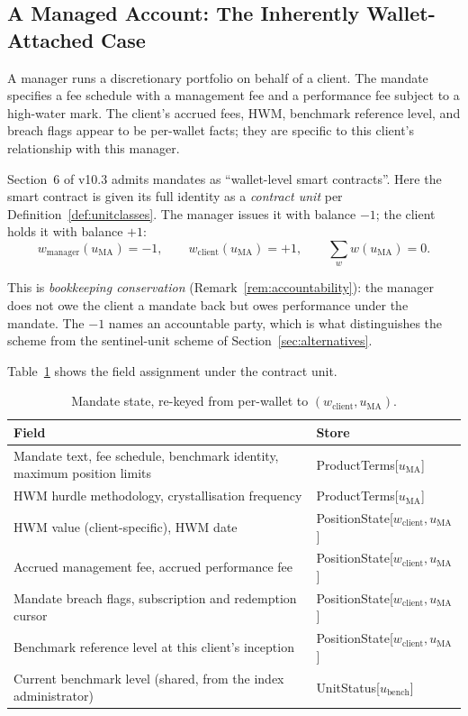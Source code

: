 \documentclass[11pt,a4paper]{article}
\begin{document}
\subsection{A Managed Account: The Inherently Wallet-Attached Case}
\label{sec:managed}

A manager runs a discretionary portfolio on behalf of a client. The mandate specifies a fee schedule with a management fee and a performance fee subject to a high-water mark. The client's accrued fees, HWM, benchmark reference level, and breach flags appear to be per-wallet facts; they are specific to this client's relationship with this manager.

Section~6 of v10.3 admits mandates as ``wallet-level smart contracts''. Here the smart contract is given its full identity as a \emph{contract unit} per Definition~\ref{def:unitclasses}. The manager issues it with balance $-1$; the client holds it with balance $+1$:
\[
w_{\mathrm{manager}}(u_{\mathrm{MA}}) = -1, \qquad w_{\mathrm{client}}(u_{\mathrm{MA}}) = +1, \qquad \sum_w w(u_{\mathrm{MA}}) = 0.
\]

\noindent This is \emph{bookkeeping conservation} (Remark~\ref{rem:accountability}): the manager does not owe the client a mandate back but owes performance under the mandate. The $-1$ names an accountable party, which is what distinguishes the scheme from the sentinel-unit scheme of Section~\ref{sec:alternatives}.

Table~\ref{tab:mandate} shows the field assignment under the contract unit.

\begin{longtable}{p{8.5cm}p{5.5cm}}
\caption{Mandate state, re-keyed from per-wallet to $(w_{\mathrm{client}}, u_{\mathrm{MA}})$.}\label{tab:mandate}\\
\toprule
\textbf{Field} & \textbf{Store} \\
\midrule
Mandate text, fee schedule, benchmark identity, maximum position limits & ProductTerms[$u_{\mathrm{MA}}$] \\
HWM hurdle methodology, crystallisation frequency & ProductTerms[$u_{\mathrm{MA}}$] \\
HWM value (client-specific), HWM date & PositionState[$w_{\mathrm{client}}, u_{\mathrm{MA}}$] \\
Accrued management fee, accrued performance fee & PositionState[$w_{\mathrm{client}}, u_{\mathrm{MA}}$] \\
Mandate breach flags, subscription and redemption cursor & PositionState[$w_{\mathrm{client}}, u_{\mathrm{MA}}$] \\
Benchmark reference level at this client's inception & PositionState[$w_{\mathrm{client}}, u_{\mathrm{MA}}$] \\
Current benchmark level (shared, from the index administrator) & UnitStatus[$u_{\mathrm{bench}}$] \\
\bottomrule
\end{longtable}
\end{document}
